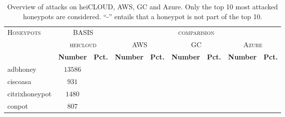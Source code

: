 \begin{table}
    \centering
    \caption[Overview of attacks on cloud providers]{Overview of attacks on heiCLOUD, AWS, GC and Azure. Only the top 10 most attacked honeypots are considered. \enquote{-} entails that a honeypot is not part of the top 10.}
    \begin{tabularx}{\linewidth}{l|cc|cccccc}
        \toprule
        \textsc{Honeypots}                       & \multicolumn{2}{c|}{BASIS}                  & \multicolumn{6}{c}{\textsc{comparision}}                                                                                                                                                        \\
                                                 & \multicolumn{2}{c|}{\textsc{heicloud}} & \multicolumn{2}{c}{\textsc{AWS}}         & \multicolumn{2}{c}{\textsc{GC}} & \multicolumn{2}{c}{\textsc{Azure}}                                                                                 \\
                                                 & \textbf{Number}                       & \textbf{Pct.}                      & \textbf{Number}                 & \textbf{Pct.}                & \textbf{Number} & \textbf{Pct.} & \textbf{Number} & \textbf{Pct.} \\
        \hline
        adbhoney \cite{adbhoney2021}             & $13586$                               &                                          &                                 &                                    &                 &                     &                 &                     \\
        ciscoasa \cite{cymmetria2018}            & $931$                                 &                                          &                                 &                                    &                 &                     &                 &                     \\
        citrixhoneypot \cite{citrixhoneypot2020} & $1480$                                &                                          &                                 &                                    &                 &                     &                 &                     \\
        conpot \cite{conpot2021}                 & $807$                                 &                                          &                                 &                                    &                 &                     &                 &                     \\

\end{tabularx}
\end{table}
